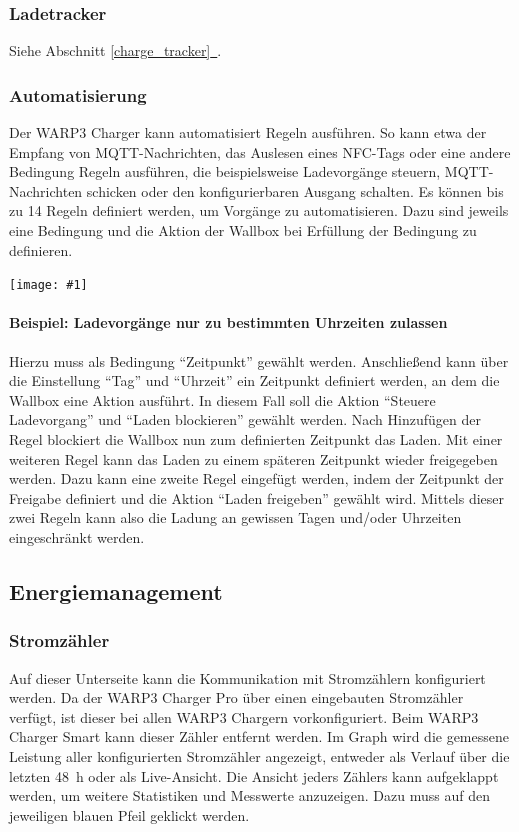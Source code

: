 \documentclass[a4paper,10pt]{article}
\newcommand{\gfx}[1]{\texttt{[image: \#1]}}
\newcommand*{\fullref}[1]{Abschnitt \hyperref[{#1}]{\ref*{#1}~\nameref*{#1}}}
\begin{document}
\begin{multicols*}{2}
    \subsubsection{Ladetracker}
    Siehe \fullref{charge_tracker}.

    \subsubsection{Automatisierung}
    Der WARP3 Charger kann automatisiert Regeln ausführen. So kann etwa
    der Empfang von MQTT-Nachrichten, das Auslesen eines NFC-Tags oder eine andere Bedingung
    Regeln ausführen, die beispielsweise Ladevorgänge steuern, MQTT-Nachrichten schicken oder
    den konfigurierbaren Ausgang schalten.
    Es können bis zu 14 Regeln definiert werden, um Vorgänge zu automatisieren.
    Dazu sind jeweils eine Bedingung und die Aktion der Wallbox bei Erfüllung der
    Bedingung zu definieren.

    \gfx{./img_warp3/resized/web_automation}

    \paragraph{Beispiel: Ladevorgänge nur zu bestimmten Uhrzeiten zulassen}
    Hierzu muss als Bedingung \enquote{Zeitpunkt} gewählt werden. Anschließend
    kann über die Einstellung \enquote{Tag} und \enquote{Uhrzeit} ein Zeitpunkt definiert werden, an
    dem die Wallbox eine Aktion ausführt. In diesem Fall soll die Aktion
    \enquote{Steuere Ladevorgang} und \enquote{Laden blockieren} gewählt werden. Nach
    Hinzufügen der Regel blockiert die Wallbox nun zum definierten
    Zeitpunkt das Laden. Mit einer weiteren Regel kann
    das Laden zu einem späteren Zeitpunkt wieder freigegeben werden. Dazu kann
    eine zweite Regel eingefügt werden, indem der Zeitpunkt der Freigabe definiert und die Aktion
    \enquote{Laden freigeben} gewählt wird. Mittels dieser zwei Regeln kann also die Ladung
    an gewissen Tagen und/oder Uhrzeiten eingeschränkt werden.


	\subsection{Energiemanagement}\label{energiemanagement}



	\subsubsection{Stromzähler}\label{meter}
    Auf dieser Unterseite kann die Kommunikation mit Stromzählern konfiguriert werden.
    Da der WARP3 Charger Pro über einen eingebauten Stromzähler verfügt, ist dieser bei allen WARP3 Chargern vorkonfiguriert.
    Beim WARP3 Charger Smart kann dieser Zähler entfernt werden.
    Im Graph wird die gemessene Leistung aller konfigurierten Stromzähler
	angezeigt, entweder als Verlauf über die letzten \SI{48}{\hour} oder als
	Live-Ansicht. Die Ansicht jeders Zählers kann aufgeklappt werden, um weitere Statistiken und Messwerte anzuzeigen. Dazu muss auf den
	jeweiligen blauen Pfeil geklickt werden.


\end{multicols*}
\end{document}
